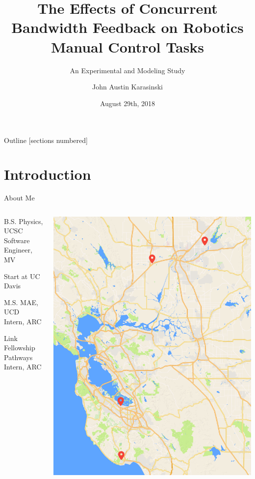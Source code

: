 \documentclass[10pt]{beamer}
\title{The Effects of Concurrent Bandwidth Feedback on Robotics Manual Control Tasks}
\subtitle{An Experimental and Modeling Study}
\date{August 29th, 2018}
\author{John Austin Karasinski}
\institute{Qualifying Examination}
\begin{document}
\maketitle

\begin{frame}{Outline}
  [sections numbered]
  \tableofcontents[]
\end{frame}

\section{Introduction}

\begin{frame}[fragile]{About Me}
  \begin{columns}[T]
    \begin{column}{.5\textwidth}
      \begin{description}[align=right]
        \setlength\itemsep{1em}
        \item [2012] B.S. Physics, UCSC\\
              Software Engineer, MV
        \item [2013] Start at UC Davis
        \item [2016] M.S. MAE, UCD\\
              Intern, ARC
        \item [2017] Link Fellowship\\
              Pathways Intern, ARC
      \end{description}
    \end{column}
    \begin{column}{.5\textwidth}
      \includegraphics[width=\textwidth]{../img/california.png}

\end{column}
\end{columns}
\end{frame}
\end{document}
